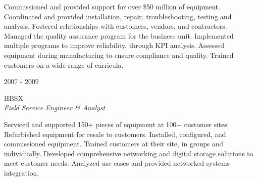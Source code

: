 \documentclass[10pt]{article} %
\begin{document}
\begin{minipage}[t]{0.5\textwidth}
\normalsize{Commissioned and provided support for over \$50 million of equipment. Coordinated and provided installation, repair, troubleshooting, testing and analysis. Fostered relationships with customers, vendors, and contractors. Managed the quality assurance program for the business unit. Implemented multiple programs to improve reliability, through KPI analysis. Assessed equipment during manufacturing to ensure compliance and quality. Trained customers on a wide range of curricula.}
\smallskip



{\raggedleft\textsc{2007 - 2009}\par}

{\raggedright\large\textsc{HBSX}\\
\textit{Field Service Engineer \& Analyst}\\[5pt]}

\normalsize{Serviced and supported 150+ pieces of equipment at 100+ customer sites. Refurbished equipment for resale to customers. Installed, configured, and commissioned equipment. Trained customers at their site, in groups and individually. Developed comprehensive networking and digital storage solutions to meet customer needs. Analyzed use cases and provided networked systems integration.}
\smallskip






\end{minipage}
\end{document}
